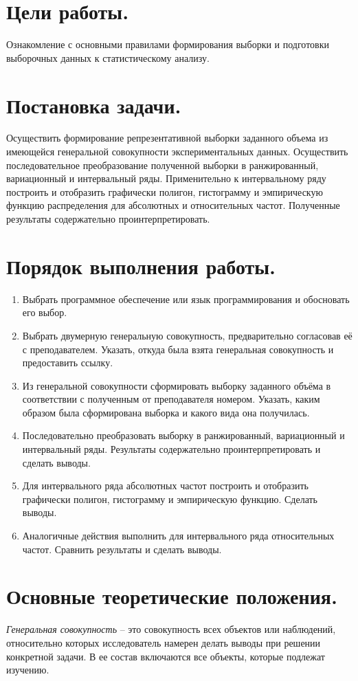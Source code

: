 \setcounter{page}{2}
\section*{Цели работы.}
Ознакомление с основными правилами формирования выборки и подготовки выборочных данных к статистическому анализу.

\section*{Постановка задачи.}
Осуществить формирование репрезентативной выборки заданного объема из имеющейся генеральной
совокупности экспериментальных данных.
Осуществить последовательное преобразование полученной выборки в ранжированный,
вариационный и интервальный ряды.
Применительно к интервальному ряду построить и отобразить графически полигон,
гистограмму и эмпирическую функцию распределения для абсолютных и относительных частот.
Полученные результаты содержательно проинтерпретировать.

\section*{Порядок выполнения работы.}
\begin{enumerate}
    \item Выбрать программное обеспечение или язык программирования и обосновать его выбор.
    \item Выбрать двумерную генеральную совокупность, предварительно согласовав её с преподавателем. Указать, откуда была взята генеральная совокупность и предоставить ссылку.
    \item Из генеральной совокупности сформировать выборку заданного объёма в соответствии с полученным от преподавателя номером. Указать, каким образом была сформирована выборка и какого вида она получилась.
    \item Последовательно преобразовать выборку в ранжированный, вариационный и интервальный ряды. Результаты содержательно проинтерпретировать и сделать выводы.
    \item Для интервального ряда абсолютных частот построить и отобразить графически полигон, гистограмму и эмпирическую функцию. Сделать выводы.
    \item Аналогичные действия выполнить для интервального ряда относительных частот. Сравнить результаты и сделать выводы.
\end{enumerate}

\section*{Основные теоретические положения.}
\textit{Генеральная совокупность} -- это совокупность всех объектов или наблюдений, относительно которых исследователь намерен делать выводы при решении конкретной задачи. В ее состав включаются все объекты, которые подлежат изучению.

